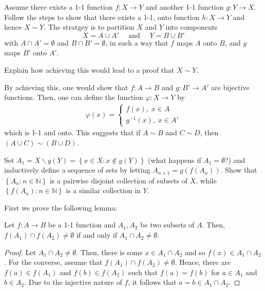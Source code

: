 \documentclass[12pt]{article}
\newcommand{\N}{\mathbb{N}}
\newenvironment{lemma}[2][Lemma]{\begin{trivlist}
		\item[\hskip \labelsep {\bfseries #1}\hskip \labelsep {\bfseries #2.}]}{\end{trivlist}}
\newenvironment{problem}[2][Problem]{\begin{trivlist}
		\item[\hskip \labelsep {\bfseries #1}\hskip \labelsep {\bfseries #2.}]}{\end{trivlist}}
\newenvironment{solution}[2][Solution]{\begin{trivlist}
		\item[\hskip \labelsep {\bfseries #1}\hskip \labelsep {\bfseries #2.}]}{\end{trivlist}}
\begin{document}
\begin{problem}{1.5.11 (Schr\"oder-Bernstein Theorem).}
  Assume there exists a 1-1 function $f:X\to Y$ and another 1-1 function $g:Y\to X$. Follow the steps to show that there exists a 1-1, onto function $h:X\to Y$ and hence $X\sim Y$. The stratgey is to partition $X$ and $Y$ into components
  \begin{equation*}
    X=A\cup A' \quad \text{ and } \quad Y=B\cup B'
  \end{equation*}
  with $A\cap A' = \emptyset$ and $B\cap B'=\emptyset$, in such a way that $f$ maps $A$ onto $B$, and $g$ maps $B'$ onto $A'$.
  \begin{enumerate}
    \item Explain how achieving this would lead to a proof that $X\sim Y$.
      \begin{solution}{(a)}
	By achieving this, one would show that $f:A\to B$ and $g:B'\to A'$ are bijective functions. Then, one can define the function $\varphi: X\to Y$ by
	\begin{align*}
	  \varphi(x) = \begin{cases}
	    f(x), \; x\in A\\
	    g^{-1}(x), \; x\in A'
	  \end{cases}
	\end{align*}
	which is 1-1 and onto. This suggests that if $A\sim B$ and $C\sim D$, then $(A\cup C) \sim (B\cup D)$.
      \end{solution}
    \item Set $A_{1}=X\backslash g(Y) = \left\{ x\in X:x\not\in g(Y) \right\}$ (what happens if $A_{1}=\emptyset$?) and inductively define a sequence of sets by letting $A_{n+1} = g(f(A_{n}))$. Show that $\left\{A_{n}:n\in \N\right\}$ is a pairwise disjoint collection of subsets of $X$, while $\left\{ f(A_{n}):n\in\N \right\}$ is a similar collection in $Y$.
     \begin{solution}{(b)}
       First we prove the following lemma:
       \begin{lemma}{1.5.11.b}
	 Let $f:A\to B$ be a 1-1 function and $A_{1},A_{2}$ be two subsets of $A$. Then, $f(A_{1})\cap f(A_{2})\neq \emptyset$ if and only if $A_{1}\cap A_{2} \neq \emptyset$. 
	 \begin{proof}
	   Let $A_{1}\cap A_{2} \neq \emptyset$. Then, there is some $x\in A_{1}\cap A_{2}$ and so $f(x) \in A_{1}\cap A_{2}$. For the converse, assume that $f(A_{1})\cap f(A_{2})\neq \emptyset$. Hence, there are $f(a)\in f(A_{1})$ and $f(b)\in f(A_{2})$ such that $f(a)=f(b)$ for $a\in A_{1}$ and $b\in A_{2}$. Due to the injective nature of $f$, it follows that $a=b\in A_{1}\cap A_{2}$. 
	 \end{proof}
       \end{lemma}


\end{solution}
\end{enumerate}
\end{problem}
\end{document}
